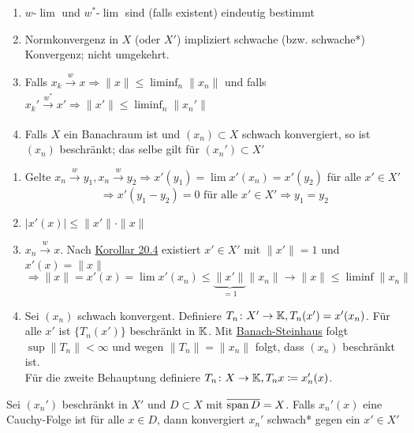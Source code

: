 \begin{eig}
	\begin{enumerate}[label=\alph*\upshape)]
		\item $w$-$\lim$ und $w^{*}$-$\lim$ sind (falls existent) eindeutig bestimmt
		\item Normkonvergenz in $X$ (oder $X'$) impliziert schwache (bzw. schwache*) Konvergenz; nicht umgekehrt.
		\item Falls $x_{k} \xrightarrow[]{w} x \Rightarrow \| x \| \leq \liminf_{n} \| x_{n} \|$ und falls $x_{k}' \xrightarrow[]{w^{*}} x' \Rightarrow \| x' \| \leq \liminf_{n} \| x_{n}' \|$ 
		\item Falls $X$ ein Banachraum ist und $(x_{n}) \subset X$ schwach konvergiert, so ist $(x_{n})$ beschränkt; das selbe gilt für $(x_{n}') \subset X'$
	\end{enumerate}	
\end{eig}


\begin{beweis}
	\begin{enumerate}[label=\alph*\upshape)]
		\item Gelte $x_{n} \xrightarrow[]{w} y_{1}, x_{n} \xrightarrow[]{w} y_{2} \Rightarrow x'(y_{1}) = \lim x'(x_{n}) = x'(y_{2})$ für alle $x' \in X'$
			\[ \Rightarrow x'(y_{1} - y_{2}) = 0 \text{ für alle } x' \in X' \Rightarrow y_{1} = y_{2} \]
		\item $| x'(x) | \leq \| x' \| \cdot \| x \|$
		\item $x_{n} \xrightarrow[]{w} x$. Nach \hyperref[kor:20.4]{Korollar 20.4} existiert $x' \in X'$ mit $\| x' \| = 1$ und $x'(x) = \| x \|$
			\[ \Rightarrow \| x \| = x'(x) = \lim x'(x_{n}) \leq \underbrace{\| x' \|}_{= 1} \| x_{n} \| \rightarrow \| x \| \leq \liminf \| x_{n} \| \]
		\item Sei $(x_{n})$ schwach konvergent. Definiere $T_{n} \colon X' \rightarrow \mathbb{K}, T_{n}(x') = x'(x_{n})$. Für alle $x'$ ist $\{ T_{n}(x') \}$ beschränkt in $\mathbb{K}$. Mit \hyperref[satz:9.5-Banach-Steinhaus]{Banach-Steinhaus} folgt $\sup \| T_{n} \| < \infty$ und wegen $\| T_{n} \| = \| x_{n} \|$ folgt, dass $(x_{n})$ beschränkt ist. \\
			Für die zweite Behauptung definiere $T_{n} \colon X \rightarrow \mathbb{K}, T_{n} x \coloneqq x_{n}'(x)$.
	\end{enumerate}		
\end{beweis}


\begin{lemma}
	Sei $(x_{n}')$ beschränkt in $X'$ und $D \subset X$ mit $\overline{\operatorname{span} D} = X$. Falls $x_{n}'(x)$ eine Cauchy-Folge ist für alle $x \in D$, dann konvergiert $x_{n}'$ schwach* gegen ein $x' \in X'$
\end{lemma}

